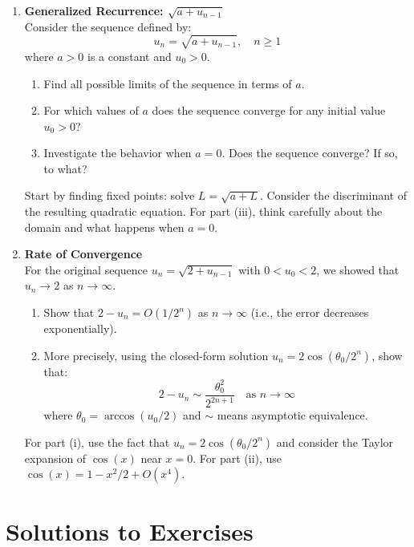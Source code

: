 \documentclass[12pt,a4paper]{article}
\theoremstyle{definition}
\begin{document}
\begin{enumerate}
    \item \textbf{Generalized Recurrence: $\sqrt{a + u_{n-1}}$}\\
    Consider the sequence defined by:
    \[
    u_n = \sqrt{a + u_{n-1}}, \quad n \geq 1
    \]
    where $a > 0$ is a constant and $u_0 > 0$.
    \begin{enumerate}[label=\roman*)]
        \item Find all possible limits of the sequence in terms of $a$.
        \item For which values of $a$ does the sequence converge for any initial value $u_0 > 0$?
        \item Investigate the behavior when $a = 0$. Does the sequence converge? If so, to what?
    \end{enumerate}
    
    \begin{hint}
    Start by finding fixed points: solve $L = \sqrt{a + L}$. Consider the discriminant of the resulting quadratic equation. For part (iii), think carefully about the domain and what happens when $a = 0$.
    \end{hint}
    
    \item \textbf{Rate of Convergence}\\
    For the original sequence $u_n = \sqrt{2 + u_{n-1}}$ with $0 < u_0 < 2$, we showed that $u_n \to 2$ as $n \to \infty$. 
    \begin{enumerate}[label=\roman*)]
        \item Show that $2 - u_n = O(1/2^n)$ as $n \to \infty$ (i.e., the error decreases exponentially).
        \item More precisely, using the closed-form solution $u_n = 2\cos(\theta_0/2^n)$, show that:
        \[
        2 - u_n \sim \frac{\theta_0^2}{2^{2n+1}} \quad \text{as } n \to \infty
        \]
        where $\theta_0 = \arccos(u_0/2)$ and $\sim$ means asymptotic equivalence.
    \end{enumerate}
    
    \begin{hint}
    For part (i), use the fact that $u_n = 2\cos(\theta_0/2^n)$ and consider the Taylor expansion of $\cos(x)$ near $x = 0$. For part (ii), use $\cos(x) = 1 - x^2/2 + O(x^4)$.
    \end{hint}
\end{enumerate}

\newpage

\section{Solutions to Exercises}
\end{document}

